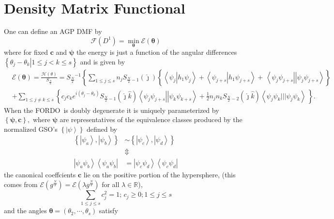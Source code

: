 \documentclass[aps,preprint]{revtex4}%
\begin{document}
\section{Density Matrix Functional}

One can define an AGP DMF by
\[
\mathcal{F}\left(  D^{1}\right)  =\min_{\mathbf{\theta}}\mathcal{E}\left(
\mathbf{\theta}\right)
\]
where for fixed $\mathbf{c}$ and $\mathbf{\psi}$ the energy is just a function
of the angular differences $\left\{  \left.  \theta_{j}-\theta_{k}\right\vert
1\leq j<k\leq s\right\}  $ and is given by
\begin{align*}
&  \mathcal{E}\left(  \mathbf{\theta}\right)  =\frac{\mathcal{H}\left(
\theta\right)  }{S_{\frac{N}{2}}}=S_{\frac{N}{2}}{}^{-1}\left\{  \sum_{1\leq
j\leq s}n_{j}S_{\frac{N}{2}-1}\left(  \hat{\jmath}\right)  \left\{  \overset
{}{\left\langle \psi_{j}\left\vert h_{1}\psi_{j}\right.  \right\rangle
+\left\langle \psi_{j+s}\left\vert h_{1}\psi_{j+s}\right.  \right\rangle
}+\,\left\langle \psi_{j}\psi_{j+s}\right\vert \left\vert \psi_{j}\psi
_{j+s}\right\rangle \right\}  \right. \\
&  +\sum_{1\leq j\neq k\leq s}\left\{  c_{j}c_{k}e^{i\left(  \theta_{j}%
-\theta_{k}\right)  }S_{\frac{N}{2}-1}\left(  \hat{\jmath}\hat{k}\right)
\left\langle \psi_{j}\psi_{j+s}\right\vert \left\vert \psi_{k}\psi
_{k+s}\right\rangle +\frac{1}{2}n_{j}n_{k}S_{\frac{N}{2}-2}\left(  \hat
{\jmath}\hat{k}\right)  \left\langle \psi_{j}\psi_{k}|||\psi_{j}\psi
_{k}\right\rangle \,\overset{}{}\right\}  .
\end{align*}
When the FORDO\ is doubly degenerate it is uniquely parameterized by $\left\{
\mathbf{\psi,c}\right\}  ,$ where $\mathbf{\psi}$ are representatives of the
equivalence classes produced by the normalized GSO's $\left\{  \left\vert
\psi\right\rangle \right\}  $ defined by
\begin{align*}
\left\{  \left\vert \psi_{a}\right\rangle ,\left\vert \psi_{b}\right\rangle
\right\}   &  \sim\left\{  \left\vert \psi_{c}\right\rangle ,\left\vert
\psi_{d}\right\rangle \right\} \\
&  \Updownarrow\\
\left\vert \psi_{a}\psi_{b}\right\rangle \left\langle \psi_{a}\psi
_{b}\right\vert  &  =\left\vert \psi_{c}\psi_{d}\right\rangle \left\langle
\psi_{c}\psi_{d}\right\vert
\end{align*}
the canonical coeffcients $\mathbf{c}$ lie on the positive portion of the
hypersphere, (this comes from $\mathcal{E}\left(  g^{\frac{N}{2}}\right)
=\mathcal{E}\left(  \lambda g^{\frac{N}{2}}\right)  $ for all $\lambda
\in\mathbb{R}$),
\[
\sum\limits_{1\leq j\leq s}c_{j}^{2}=1;\,c_{j}\geq0;1\leq j\leq s
\]
and the angles $\mathbf{\theta}=\left(  \theta_{2},\cdots,\theta_{s}\right)  $ satisfy%
\end{document}
